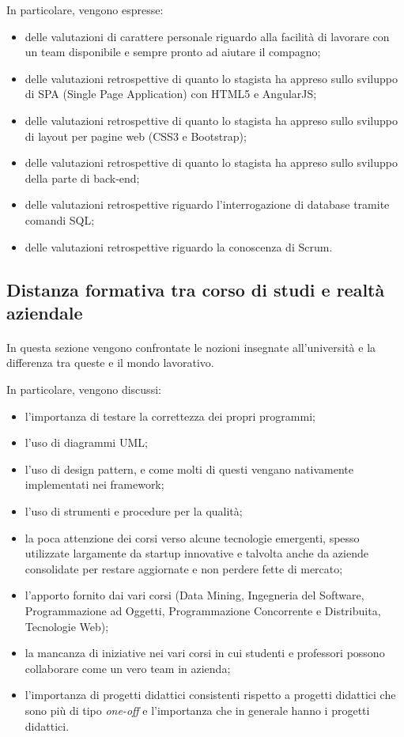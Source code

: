 \documentclass[
article,
10pt, %
oneside, %
BCOR5mm, %
]{scrartcl}
\begin{document}
In particolare, vengono espresse:

\begin{itemize}
\item delle valutazioni di carattere personale riguardo alla facilità di
  lavorare con un team disponibile e sempre pronto ad aiutare il compagno;
\item delle valutazioni retrospettive di quanto lo stagista ha appreso sullo
  sviluppo di SPA (Single Page Application) con HTML5 e AngularJS;
\item delle valutazioni retrospettive di quanto lo stagista ha appreso sullo
  sviluppo di layout per pagine web (CSS3 e Bootstrap);
\item delle valutazioni retrospettive di quanto lo stagista ha appreso sullo
  sviluppo della parte di back-end;
\item delle valutazioni retrospettive riguardo l'interrogazione di database
  tramite comandi SQL;
\item delle valutazioni retrospettive riguardo la conoscenza di Scrum.
\end{itemize}

\subsection{Distanza formativa tra corso di studi e realtà aziendale}
\paragraph{} In questa sezione vengono confrontate le nozioni insegnate
all'università e la differenza tra queste e il mondo lavorativo.

In particolare, vengono discussi:

\begin{itemize}
\item l'importanza di testare la correttezza dei propri programmi;
\item l'uso di diagrammi UML;
\item l'uso di design pattern, e come molti di questi vengano nativamente
  implementati nei framework;
\item l'uso di strumenti e procedure per la qualità;
\item la poca attenzione dei corsi verso alcune tecnologie emergenti,
  spesso utilizzate largamente da startup innovative e talvolta anche da
  aziende consolidate per restare aggiornate e non perdere fette di mercato;
\item l'apporto fornito dai vari corsi (Data Mining, Ingegneria del Software,
  Programmazione ad Oggetti, Programmazione Concorrente e Distribuita,
  Tecnologie Web);
\item la mancanza di iniziative nei vari corsi in cui studenti e professori
  possono collaborare come un vero team in azienda;
\item l'importanza di progetti didattici consistenti rispetto a progetti
  didattici che sono più di tipo \emph{one-off} e l'importanza che in generale
  hanno i progetti didattici.
\end{itemize}
\end{document}
